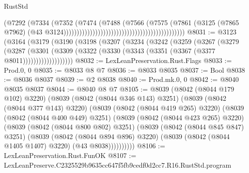\begin{lexlean}{RustStd}
\begin{coremodule}
                                                                            (@7292
                                                                              (@7334
                                                                                (@7352
                                                                                  (@7474
                                                                                    (@7488
                                                                                      (@7566
                                                                                        (@7575
                                                                                          (@7861
                                                                                            (@3125
                                                                                              (@7865
                                                                                                @7962)
                                                                                              (@43
                                                                                                @3124))))))))))))))))))))))))))))))))))))))))))))))
@8031 := @3123
    (@3164
      (@3179
        (@3190
          (@3198
            (@3207
              (@3234
                (@3242
                  (@3259
                    (@3267
                      (@3279
                        (@3287
                          (@3301
                            (@3309
                              (@3322 (@3330 (@3343 (@3351 (@3367 (@3377 @8011)))))))))))))))))))
@8032 := LexLeanPreservation.Rust.Flags
@8033 := Prod.{0, 0}
@8035 := @8033 @8 @7
@8036 := @8033 @8035
@8037 := Bool
@8038 := @8036 @8037
@8039 := @2 @8038
@8040 := Prod.mk.{0, 0}
@8042 := @8040 @8035 @8037
@8044 := @8040 @8 @7
@8105 := @8039
    (@8042 (@8044 @179 @102) @3220)
    (@8039
      (@8042 (@8044 @346 @143) @3251)
      (@8039
        (@8042 (@8044 @377 @143) @3220)
        (@8039
          (@8042 (@8044 @419 @265) @3220)
          (@8039
            (@8042 (@8044 @400 @449) @3251)
            (@8039
              (@8042 (@8044 @423 @265) @3220)
              (@8039
                (@8042 (@8044 @800 @802) @3251)
                (@8039
                  (@8042 (@8044 @845 @847) @3251)
                  (@8039
                    (@8042 (@8044 @894 @896) @3220)
                    (@8039 (@8042 (@8044 @1405 @1407) @3220) (@43 @8038))))))))))
@8106 := LexLeanPreservation.Rust.FunOK
@8107 := LexLeanPreserve.C2325529b9635cc647f5fb9cedf0d2cc7.R16.RustStd.program

\end{coremodule}
\end{lexlean}
